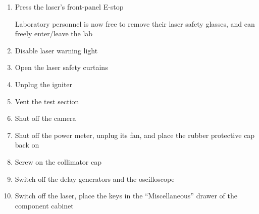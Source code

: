 \begin{enumerate}
\def\labelenumi{\arabic{enumi}.}
\item
  Press the laser's front-panel E-stop

  {\color{cyan} Laboratory personnel is now free to remove their laser safety
  glasses, and can freely enter/leave the lab}
\item
  Disable laser warning light
\item
  Open the laser safety curtains
\item
  Unplug the igniter
\item
  Vent the test section
\item
  Shut off the camera
\item
  Shut off the power meter, unplug its fan, and place the rubber
  protective cap back on
\item
  Screw on the collimator cap
\item
  Switch off the delay generators and the oscilloscope
\item
  Switch off the laser, place the keys in the ``Miscellaneous'' drawer
  of the component cabinet
\end{enumerate}